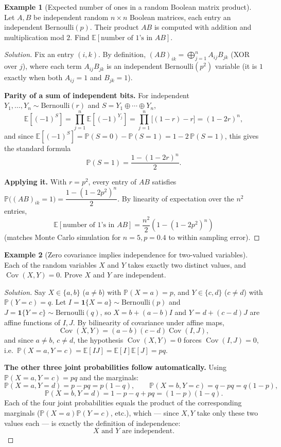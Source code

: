\documentclass[11pt]{article}
\theoremstyle{definition}
\newtheorem{example}{Example}[section]
\newcommand{\E}{\mathbb{E}}
\newcommand{\Cov}{\operatorname{Cov}}
\begin{document}
\begin{example}[Expected number of ones in a random Boolean matrix product]
Let $A,B$ be independent random $n\times n$ Boolean matrices, each entry an independent $\mathrm{Bernoulli}(p)$. Their product $AB$ is computed with addition and multiplication mod $2$. Find $\E[\text{number of $1$'s in } AB]$.
\end{example}

\begin{proof}[Solution]
Fix an entry $(i,k)$. By definition, $(AB)_{ik}=\bigoplus_{j=1}^n A_{ij}B_{jk}$ (XOR over $j$), where each term $A_{ij}B_{jk}$ is an independent $\mathrm{Bernoulli}(p^2)$ variable (it is $1$ exactly when both $A_{ij}=1$ and $B_{jk}=1$).

\textbf{Parity of a sum of independent bits.} For independent $Y_1,\dots,Y_n\sim\mathrm{Bernoulli}(r)$ and $S=Y_1\oplus\cdots\oplus Y_n$,
\[
\E[(-1)^S]=\prod_{j=1}^n\E[(-1)^{Y_j}]=\prod_{j=1}^n\bigl[(1-r)-r\bigr]=(1-2r)^n,
\]
and since $\E[(-1)^S]=\mathbb P(S=0)-\mathbb P(S=1)=1-2\,\mathbb P(S=1)$, this gives the standard formula
\[
\mathbb P(S=1)=\frac{1-(1-2r)^n}2.
\]

\textbf{Applying it.} With $r=p^2$, every entry of $AB$ satisfies $\mathbb P\bigl((AB)_{ik}=1\bigr)=\dfrac{1-(1-2p^2)^n}2$. By linearity of expectation over the $n^2$ entries,
\[
\E[\text{number of $1$'s in } AB]=\boxed{\frac{n^2}2\left(1-(1-2p^2)^n\right)}
\]
(matches Monte Carlo simulation for $n=5,p=0.4$ to within sampling error).
\end{proof}

\begin{example}[Zero covariance implies independence for two-valued variables]
Each of the random variables $X$ and $Y$ takes exactly two distinct values, and $\Cov(X,Y)=0$. Prove $X$ and $Y$ are independent.
\end{example}

\begin{proof}[Solution]
Say $X\in\{a,b\}$ ($a\neq b$) with $\mathbb P(X=a)=p$, and $Y\in\{c,d\}$ ($c\neq d$) with $\mathbb P(Y=c)=q$. Let $I=\mathbf1\{X=a\}\sim\mathrm{Bernoulli}(p)$ and $J=\mathbf1\{Y=c\}\sim\mathrm{Bernoulli}(q)$, so $X=b+(a-b)I$ and $Y=d+(c-d)J$ are affine functions of $I,J$. By bilinearity of covariance under affine maps,
\[
\Cov(X,Y)=(a-b)(c-d)\Cov(I,J),
\]
and since $a\neq b$, $c\neq d$, the hypothesis $\Cov(X,Y)=0$ forces $\Cov(I,J)=0$, i.e.\ $\mathbb P(X=a,Y=c)=\E[IJ]=\E[I]\E[J]=pq$.

\textbf{The other three joint probabilities follow automatically.} Using $\mathbb P(X=a,Y=c)=pq$ and the marginals:
\[
\mathbb P(X=a,Y=d)=p-pq=p(1-q),\qquad \mathbb P(X=b,Y=c)=q-pq=q(1-p),
\]
\[
\mathbb P(X=b,Y=d)=1-p-q+pq=(1-p)(1-q).
\]
Each of the four joint probabilities equals the product of the corresponding marginals ($\mathbb P(X=a)\mathbb P(Y=c)$, etc.), which — since $X,Y$ take only these two values each — is exactly the definition of independence:
\[
\boxed{X \text{ and } Y \text{ are independent}}.
\]
\end{proof}
\end{document}
